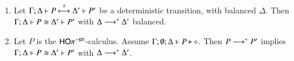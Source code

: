 
\begin{lemma}\rm
	\label{lem:tau_inert}
	\begin{enumerate}[1)]
		\item %
		Let $\Gamma; \Delta \vdash P \stackrel{\tau}{\longmapsto} \Delta' \vdash P'$ be a deterministic transition,
		with balanced $\Delta$. Then 
		$\Gamma; \Delta \vdash P \cong \Delta'\vdash P'$ 
		with $\Delta \longrightarrow^\ast \Delta'$ balanced.
		\item 
		Let $P$ is the $\mathsf{HO}\pi^{-\mathsf{sh}}$-calculus. 
		Assume $\Gamma; \emptyset; \Delta \vdash P \triangleright \diamond$. Then 
		$P \longrightarrow^\ast P'$ implies $\Gamma; \Delta \vdash 
		P \cong \Delta'\vdash P'$ with $\Delta \longrightarrow^\ast \Delta'$. 
	\end{enumerate}
\end{lemma}











